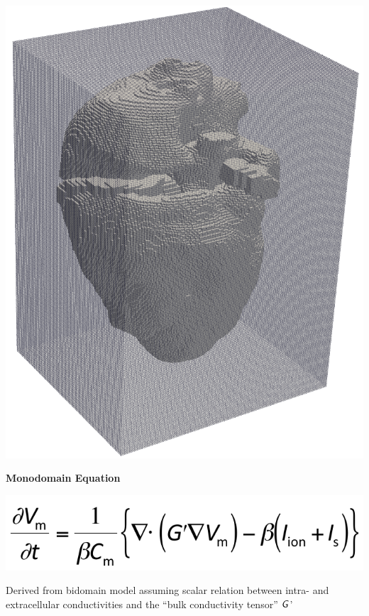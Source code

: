 \documentclass[20pt]{ICSPoster}
\begin{document}
\begin{posterbox}[2]
\begin{headerbox}[
        title=Modeling Aspects,
        width=0.47\textwidth,
        height=0.25\textheight]
      \begin{minipage}{0.35\textwidth}\sf
        \includegraphics[width=\textwidth]{pic_heart_box.png}
      \end{minipage}
      \begin{minipage}{0.50\textwidth}\sf
        \textbf{Monodomain Equation}
        \begin{center}
          \includegraphics[scale=0.55]{Monodomain}
        \end  {center}
        \vspace{-0.25cm}
        \begin{compactitem}
          \item Derived from bidomain model assuming scalar relation between intra- and extracellular
                conductivities and the ``bulk conductivity tensor'' $\text{\textsf{\textit{G}}}$'
        \end{compactitem}


\end{minipage}
\end{headerbox}
\end{posterbox}
\end{document}
